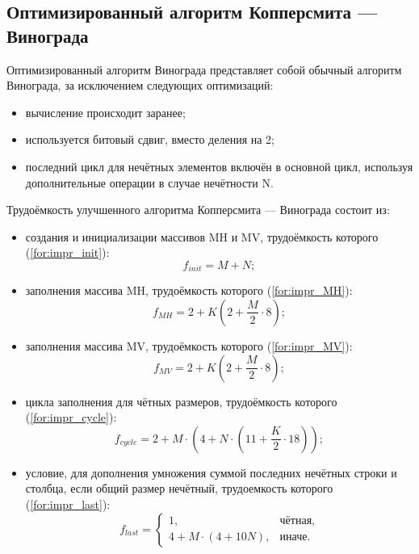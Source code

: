 \subsection{Оптимизированный алгоритм Копперсмита — Винограда}

Оптимизированный алгоритм Винограда представляет собой обычный алгоритм Винограда, за исключением следующих оптимизаций:
\begin{itemize}
	\item вычисление происходит заранее;
	\item используется битовый сдвиг, вместо деления на 2;
	\item последний цикл для нечётных элементов включён в основной цикл,
	используя дополнительные операции в случае нечётности N.
\end{itemize}


Трудоёмкость улучшенного алгоритма Копперсмита — Винограда состоит из:
\begin{itemize}
	\item создания и инициализации массивов MH и MV, трудоёмкость которого (\ref{for:impr_init}):
	\begin{equation}
		\label{for:impr_init}
		f_{init} = M + N;
	\end{equation}
	
	\item заполнения массива MH, трудоёмкость которого (\ref{for:impr_MH}):
	\begin{equation}
		\label{for:impr_MH}
		f_{MH} =  2 + K (2 + \frac{M}{2} \cdot 8);
	\end{equation}
	
	\item заполнения массива MV, трудоёмкость которого (\ref{for:impr_MV}):
	\begin{equation}
		\label{for:impr_MV}
		f_{MV} =  2 + K (2 + \frac{M}{2} \cdot 8);
	\end{equation}
	
	\item цикла заполнения для чётных размеров, трудоёмкость которого (\ref{for:impr_cycle}):
	\begin{equation}
		\label{for:impr_cycle}
		f_{cycle} =2 + M \cdot (4 + N \cdot (11 + \frac{K}{2} \cdot 18));
	\end{equation}
	
	\item условие, для дополнения умножения суммой последних нечётных строки и столбца, если общий размер нечётный, трудоемкость которого (\ref{for:impr_last}):
	\begin{equation}
		\label{for:impr_last}
		f_{last} = 
		\begin{cases}
			1, & \text{чётная,}\\
			4 + M \cdot (4 + 10N), & \text{иначе.}
		\end{cases}
	\end{equation}
\end{itemize}

